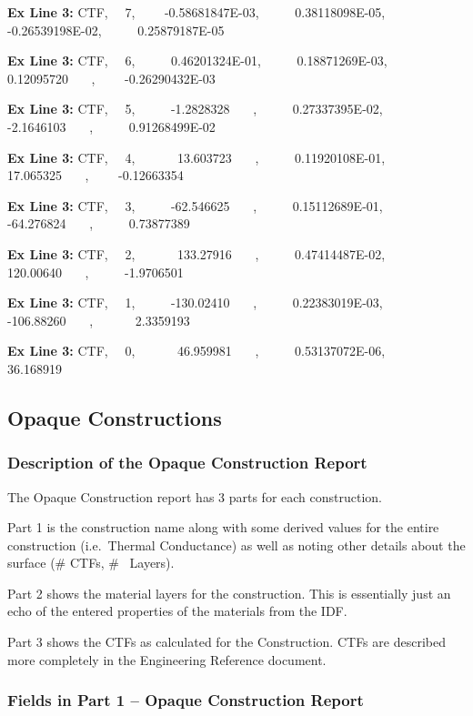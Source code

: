 \textbf{Ex Line 3:} CTF,~~ 7,~~~~ -0.58681847E-03,~~~~~ 0.38118098E-05,~~~~ -0.26539198E-02,~~~~~ 0.25879187E-05

\textbf{Ex Line 3:} CTF,~~ 6,~~~~~ 0.46201324E-01,~~~~~ 0.18871269E-03,~~~~~ 0.12095720~~~ ,~~~~ -0.26290432E-03

\textbf{Ex Line 3:} CTF,~~ 5,~~~~~ -1.2828328~~~ ,~~~~~ 0.27337395E-02,~~~~~ -2.1646103~~~ ,~~~~~ 0.91268499E-02

\textbf{Ex Line 3:} CTF,~~ 4,~~~~~~ 13.603723~~~ ,~~~~~ 0.11920108E-01,~~~~~~ 17.065325~~~ ,~~~~ -0.12663354

\textbf{Ex Line 3:} CTF,~~ 3,~~~~~ -62.546625~~~ ,~~~~~ 0.15112689E-01,~~~~~ -64.276824~~~ ,~~~~~ 0.73877389

\textbf{Ex Line 3:} CTF,~~ 2,~~~~~~ 133.27916~~~ ,~~~~~ 0.47414487E-02,~~~~~~ 120.00640~~~ ,~~~~~ -1.9706501

\textbf{Ex Line 3:} CTF,~~ 1,~~~~~ -130.02410~~ ~,~~~~~ 0.22383019E-03,~~~~~ -106.88260~~~ ,~~~~~~ 2.3359193

\textbf{Ex Line 3:} CTF,~~ 0,~~~~~~ 46.959981~~~ ,~~~~~ 0.53137072E-06,~~~~~~ 36.168919~~~

\subsection{Opaque Constructions}\label{opaque-constructions}

\subsubsection{Description of the Opaque Construction Report}\label{description-of-the-opaque-construction-report}

The Opaque Construction report has 3 parts for each construction.

Part 1 is the construction name along with some derived values for the entire construction (i.e.~Thermal Conductance) as well as noting other details about the surface (\# CTFs, \#~ Layers).

Part 2 shows the material layers for the construction. This is essentially just an echo of the entered properties of the materials from the IDF.

Part 3 shows the CTFs as calculated for the Construction. CTFs are described more completely in the Engineering Reference document.

\subsubsection{Fields in Part 1 -- Opaque Construction Report}\label{fields-in-part-1-opaque-construction-report}

